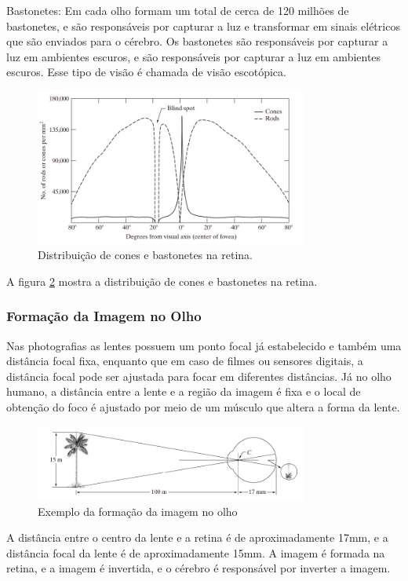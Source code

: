\documentclass[12pt]{article}
\begin{document}
    Bastonetes: Em cada olho formam um total de cerca de 120 milhões de bastonetes, e são responsáveis
    por capturar a luz e transformar em sinais elétricos que são enviados para o cérebro. Os bastonetes
    são responsáveis por capturar a luz em ambientes escuros, e são responsáveis por capturar a luz em
    ambientes escuros. Esse tipo de visão é chamada de visão escotópica.
\begin{figure}[H]
    \centering
    \includegraphics[width=0.8\textwidth]{images/6.png}
    \caption{Distribuição de cones e bastonetes na retina.}
    \label{fig:exemplo}
\end{figure}

A figura \ref{fig:exemplo} mostra a distribuição de cones e bastonetes na retina.

    \subsubsection{Formação da Imagem no Olho}

    Nas photografias as lentes possuem um ponto focal já estabelecido e também uma distância focal
    fixa, enquanto que em caso de filmes ou sensores digitais, a distância focal pode ser ajustada
    para focar em diferentes distâncias. Já no olho humano, a distância entre a lente e a região da
    imagem é fixa e o local de obtenção do foco é ajustado por meio de um músculo que altera a forma
    da lente.
    \begin{figure}[H]
        \centering
        \includegraphics[width=0.8\textwidth]{images/7.png}
        \caption{Exemplo da formação da imagem no olho}
        \label{fig:exemplo}
    \end{figure}
    A distância entre o centro da lente e a retina é de aproximadamente 17mm, e a distância focal da
    lente é de aproximadamente 15mm. A imagem é formada na retina, e a imagem é invertida, e o cérebro
    é responsável por inverter a imagem.
\end{document}
